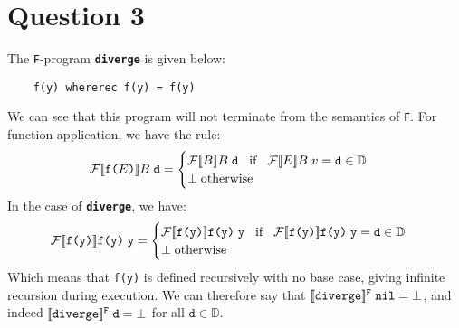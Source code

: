 \documentclass{article}
\begin{document}
\section*{Question 3}
The \texttt{F}-program \textbf{\texttt{diverge}} is given below:
\begin{verbatim}
    f(y) whererec f(y) = f(y)
\end{verbatim}
We can see that this program will not terminate from the semantics of \texttt{F}. For function application, we have the rule:
\begin{equation*}
    \mathcal{F} [\![ \texttt{f(}E\texttt{)} ]\!] B \hspace{1mm} \texttt{d} = \begin{cases}
        \mathcal{F} [\![ B ]\!] B \hspace{1mm} \texttt{d} \hspace{3mm} \text{if} \hspace{3mm} \mathcal{F} [\![ E ]\!] B \hspace{1mm} v = \texttt{d} \in \mathbb{D} \\
        \bot \hspace{1mm} \text{otherwise}
    \end{cases}
\end{equation*}
In the case of \textbf{\texttt{diverge}}, we have:
\begin{equation*}
    \mathcal{F} [\![ \texttt{f(y)} ]\!] \texttt{f(y)} \hspace{1mm} \texttt{y} = \begin{cases}
        \mathcal{F} [\![ \texttt{f(y)} ]\!] \texttt{f(y)} \hspace{1mm} \texttt{y} \hspace{3mm} \text{if} \hspace{3mm} \mathcal{F} [\![ \texttt{f(y)} ]\!] \texttt{f(y)} \hspace{1mm} \texttt{y} = \texttt{d} \in \mathbb{D} \\
        \bot \hspace{1mm} \text{otherwise}
    \end{cases}
\end{equation*}
Which means that \texttt{f(y)} is defined recursively with no base case, giving infinite recursion during execution. We can therefore say that $[\![\texttt{diverge}]\!]^{\texttt{F}} \hspace{1mm} \texttt{nil} = \bot$, and indeed $[\![\texttt{diverge}]\!]^{\texttt{F}} \hspace{1mm} \texttt{d} = \bot$ for all $\texttt{d} \in \mathbb{D}$.
\end{document}
